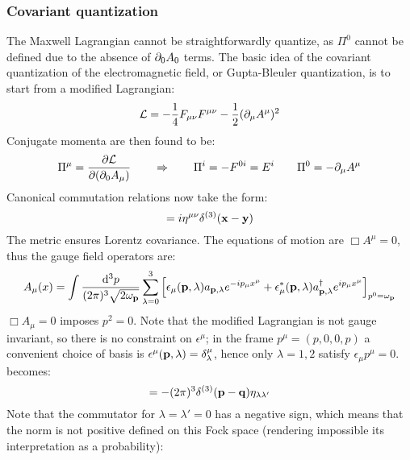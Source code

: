 \subsubsection{Covariant quantization}

The Maxwell Lagrangian  cannot be straightforwardly quantize, as $ \Pi^0 $ cannot be defined due to the absence of $ \partial_0 A_0 $ terms. The basic idea of the covariant quantization of the electromagnetic field, or Gupta-Bleuler quantization, is to start from a modified Lagrangian:
\begin{equation}
  \mathcal{L} = - \frac{1}{4} F_{\mu \nu} F^{\mu \nu} - \frac{1}{2} (\partial_\mu A^\mu)^2
\end{equation}
Conjugate momenta are then found to be:
\begin{equation*}
  \Pi^\mu = \frac{\partial \mathcal{L}}{\partial (\partial_0 A_\mu)}
  \qquad \Rightarrow \qquad
  \Pi^i = - F^{0i} = E^i
  \qquad
  \Pi^0 = - \partial_\mu A^\mu
\end{equation*}
Canonical commutation relations now take the form:
\begin{equation}
  [A^\mu(t,\ve{x}) , \Pi^\nu(t,\ve{y})] = i \eta^{\mu \nu} \delta^{(3)}(\ve{x} - \ve{y})
  \label{eq:qed-canon-comm-rel-1}
\end{equation}
The metric ensures Lorentz covariance. The equations of motion are $ \Box A^\mu = 0 $, thus the gauge field operators are:
\begin{equation}
  A_\mu(x) = \int \frac{\mathrm{d}^3p}{(2\pi)^3 \sqrt{2\omega_{\mathbf{p}}}} \sum_{\lambda = 0}^{3} \left[ \epsilon_\mu(\mathbf{p},\lambda) a_{\mathbf{p},\lambda} e^{-i p_\mu x^\mu} + \epsilon_\mu^*(\mathbf{p},\lambda) a_{\mathbf{p},\lambda}^\dagger e^{i p_\mu x^\mu} \right]_{p^0 = \omega_{\mathbf{p}}}
\end{equation}
$ \Box A_\mu = 0 $ imposes $ p^2 = 0 $. Note that the modified Lagrangian is not gauge invariant, so there is no constraint on $ \epsilon^\mu $; in the frame $ p^\mu = (p,0,0,p) $ a convenient choice of basis is $ \epsilon^\mu(\mathbf{p},\lambda) = \delta^\mu_\lambda $, hence only $ \lambda = 1,2 $ satisfy $ \epsilon_\mu p^\mu = 0 $.  becomes:
\begin{equation}
  [a_{\ve{p},\lambda} , a_{\ve{p},\lambda'}\dg] = - (2\pi)^3 \delta^{(3)}(\ve{p} - \ve{q}) \eta_{\lambda \lambda'}
\end{equation}
Note that the commutator for $ \lambda = \lambda' = 0 $ has a negative sign, which means that the norm is not positive defined on this Fock space (rendering impossible its interpretation as a probability):
